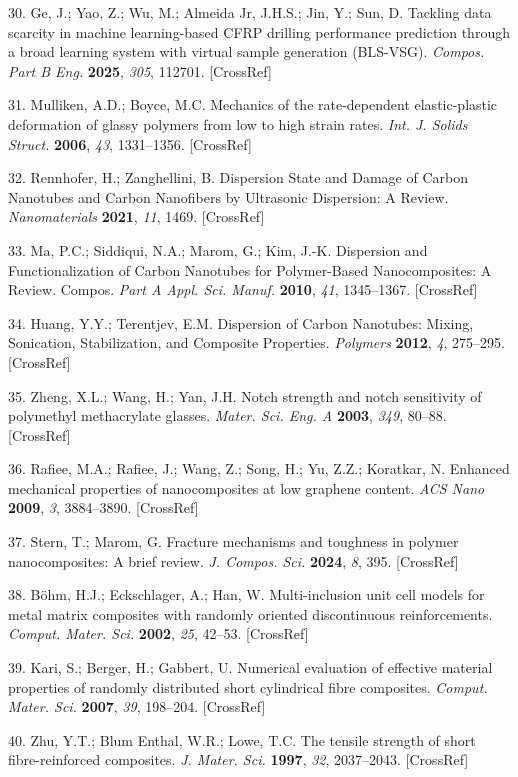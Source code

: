 \documentclass{article}
\begin{document}
\begin{hangpars}
30. Ge, J.; Yao, Z.; Wu, M.; Almeida Jr, J.H.S.; Jin, Y.; Sun, D. Tackling data scarcity in machine learning-based CFRP drilling performance prediction through a broad learning system with virtual sample generation (BLS-VSG). \emph{Compos. Part B Eng.} \textbf{2025}, \emph{305}, 112701. [CrossRef]

31. Mulliken, A.D.; Boyce, M.C. Mechanics of the rate-dependent elastic-plastic deformation of glassy polymers from low to high strain rates. \emph{Int. J. Solids Struct.} \textbf{2006}, \emph{43}, 1331–1356. [CrossRef]

32. Rennhofer, H.; Zanghellini, B. Dispersion State and Damage of Carbon Nanotubes and Carbon Nanofibers by Ultrasonic Dispersion: A Review. \emph{Nanomaterials} \textbf{2021}, \emph{11}, 1469. [CrossRef]

33. Ma, P.C.; Siddiqui, N.A.; Marom, G.; Kim, J.-K. Dispersion and Functionalization of Carbon Nanotubes for Polymer-Based Nanocomposites: A Review. Compos. \emph{Part A Appl. Sci. Manuf.} \textbf{2010}, \emph{41}, 1345–1367. [CrossRef]

34. Huang, Y.Y.; Terentjev, E.M. Dispersion of Carbon Nanotubes: Mixing, Sonication, Stabilization, and Composite Properties. \emph{Polymers} \textbf{2012}, \emph{4}, 275–295. [CrossRef]

35. Zheng, X.L.; Wang, H.; Yan, J.H. Notch strength and notch sensitivity of polymethyl methacrylate glasses. \emph{Mater. Sci. Eng. A} \textbf{2003}, \emph{349}, 80–88. [CrossRef]

36. Rafiee, M.A.; Rafiee, J.; Wang, Z.; Song, H.; Yu, Z.Z.; Koratkar, N. Enhanced mechanical properties of nanocomposites at low graphene content. \emph{ACS Nano} \textbf{2009}, \emph{3}, 3884–3890. [CrossRef]

37. Stern, T.; Marom, G. Fracture mechanisms and toughness in polymer nanocomposites: A brief review. \emph{J. Compos. Sci.} \textbf{2024}, \emph{8}, 395. [CrossRef]

38. Böhm, H.J.; Eckschlager, A.; Han, W. Multi-inclusion unit cell models for metal matrix composites with randomly oriented discontinuous reinforcements. \emph{Comput. Mater. Sci.} \textbf{2002}, \emph{25}, 42–53. [CrossRef]

39. Kari, S.; Berger, H.; Gabbert, U. Numerical evaluation of effective material properties of randomly distributed short cylindrical fibre composites. \emph{Comput. Mater. Sci.} \textbf{2007}, \emph{39}, 198–204. [CrossRef]

40. Zhu, Y.T.; Blum Enthal, W.R.; Lowe, T.C. The tensile strength of short fibre-reinforced composites. \emph{J. Mater. Sci.} \textbf{1997}, \emph{32}, 2037–2043. [CrossRef]


\end{hangpars}
\end{document}
